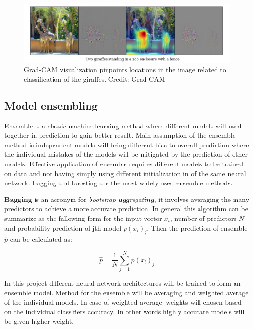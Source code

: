 \documentclass[12pt, twoside, a4paper]{article}
\begin{document}
\begin{figure}[H]%
    \centering
    \includegraphics[width=\textwidth]{img/gradcam.png}%
    \caption{Grad-CAM visualization pinpoints locations in the image related to classification of the giraffes. Credit: Grad-CAM \cite{heatmap}}%
    \label{fig:gradcam}%
\end{figure}

\subsection{Model ensembling}
Ensemble is a classic machine learning method where different models will used together in prediction to gain better result. Main assumption of the ensemble method is independent models will bring different bias to overall prediction where the individual mistakes of the models will be mitigated by the prediction of other models. Effective application of ensemble requires different models to be trained on data and not having simply using different initialization in of the same neural network. Bagging \cite{bagging} and boosting \cite{boosting} are the most widely used ensemble methods. 

\textbf{Bagging} is an acronym for \textit{\textbf{b}ootstrap \textbf{agg}regat\textbf{ing}}, it involves averaging the many predictors to achieve a more accurate prediction. In general this algorithm can be summarize as the fallowing form for the input vector $x_{i}$, number of predictors $N$ and probability prediction of jth model $p(x_{i})_{j}$. Then the prediction of ensemble $\hat{p}$ can be calculated as:

\begin{equation*}
    \hat{p} = \frac{1}{N}\sum_{j=1}^{N} p(x_{i})_{j}
\end{equation*}

In this project different neural network architectures will be trained to form an ensemble model. Method for the ensemble will be averaging and weighted average of the individual models. In case of weighted average, weights will chosen based on the individual classifiers accuracy. In other words highly accurate models will be given higher weight. 
\end{document}
